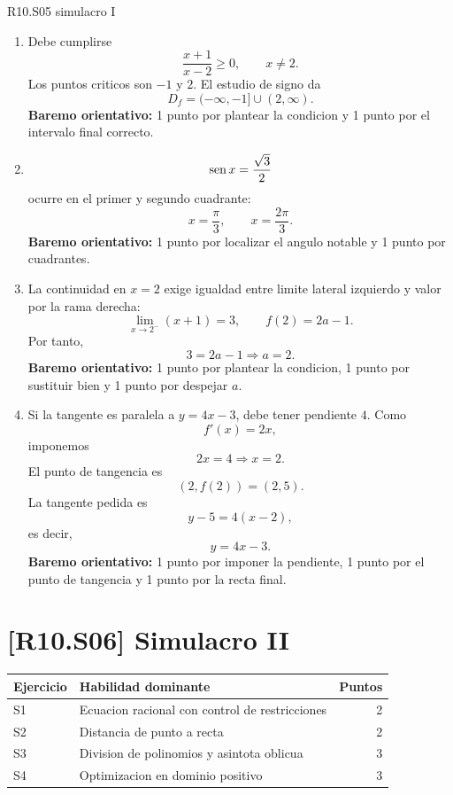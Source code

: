 \begin{fullsolution}{R10.S05 simulacro I}
\begin{enumerate}[label=\textbf{SM-R10.S05-\arabic*:}, leftmargin=*]
  \item Debe cumplirse
  \[
  \frac{x+1}{x-2}\geq 0,\qquad x\neq 2.
  \]
  Los puntos criticos son \(-1\) y \(2\). El estudio de signo da
  \[
  D_f=(-\infty,-1]\cup(2,\infty).
  \]
  \textbf{Baremo orientativo:} 1 punto por plantear la condicion y 1 punto por el intervalo
  final correcto.
  \item
  \[
  \operatorname{sen} x=\frac{\sqrt{3}}{2}
  \]
  ocurre en el primer y segundo cuadrante:
  \[
  x=\frac{\pi}{3},\qquad x=\frac{2\pi}{3}.
  \]
  \textbf{Baremo orientativo:} 1 punto por localizar el angulo notable y 1 punto por cuadrantes.
  \item La continuidad en \(x=2\) exige igualdad entre limite lateral izquierdo y valor por la
  rama derecha:
  \[
  \lim_{x\to 2^-}(x+1)=3,
  \qquad
  f(2)=2a-1.
  \]
  Por tanto,
  \[
  3=2a-1 \Longrightarrow a=2.
  \]
  \textbf{Baremo orientativo:} 1 punto por plantear la condicion, 1 punto por sustituir bien y
  1 punto por despejar \(a\).
  \item Si la tangente es paralela a \(y=4x-3\), debe tener pendiente \(4\). Como
  \[
  f'(x)=2x,
  \]
  imponemos
  \[
  2x=4 \Longrightarrow x=2.
  \]
  El punto de tangencia es
  \[
  (2,f(2))=(2,5).
  \]
  La tangente pedida es
  \[
  y-5=4(x-2),
  \]
  es decir,
  \[
  y=4x-3.
  \]
  \textbf{Baremo orientativo:} 1 punto por imponer la pendiente, 1 punto por el punto de
  tangencia y 1 punto por la recta final.
\end{enumerate}
\end{fullsolution}

\section{[R10.S06] Simulacro II}

\begin{tcolorbox}[basebox,title={Baremo orientativo del simulacro II}]
\begin{tabularx}{\textwidth}{l X r}
\toprule
Ejercicio & Habilidad dominante & Puntos \\
\midrule
S1 & Ecuacion racional con control de restricciones & 2 \\
S2 & Distancia de punto a recta & 2 \\
S3 & Division de polinomios y asintota oblicua & 3 \\
S4 & Optimizacion en dominio positivo & 3 \\
\bottomrule
\end{tabularx}
\end{tcolorbox}

